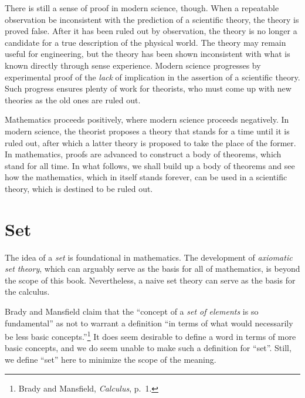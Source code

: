 There is still a sense of proof in modern science, though. When a repeatable
observation be inconsistent with the prediction of a scientific theory, the
theory is proved false. After it has been ruled out by observation, the theory
is no longer a candidate for a true description of the physical world. The
theory may remain useful for engineering, but the theory has been shown
inconsistent with what is known directly through sense experience. Modern
science progresses by experimental proof of the \emph{lack} of implication in
the assertion of a scientific theory. Such progress ensures plenty of work for
theorists, who must come up with new theories as the old ones are ruled out.

Mathematics proceeds positively, where modern science proceeds negatively. In
modern science, the theorist proposes a theory that stands for a time until it
is ruled out, after which a latter theory is proposed to take the place of the
former. In mathematics, proofs are advanced to construct a body of theorems,
which stand for all time. In what follows, we shall build up a body of theorems
and see how the mathematics, which in itself stands forever, can be used in a
scientific theory, which is destined to be ruled out.

\section{Set}

The idea of a \emph{set} is foundational in mathematics. The development of
\emph{axiomatic set theory}, which can arguably serve as the basis for all of
mathematics, is beyond the scope of this book. Nevertheless, a naive set theory
can serve as the basis for the calculus.

Brady and Mansfield claim that the ``concept of a \emph{set of elements} is so
fundamental'' as not to warrant a definition ``in terms of what would
necessarily be less basic concepts.''\footnote{%
   Brady and Mansfield, {\it Calculus}, p.~1.%
}
It does seem desirable to define a word in terms of more basic concepts, and we
do seem unable to make such a definition for ``set''.  Still, we define ``set''
here to minimize the scope of the meaning.

